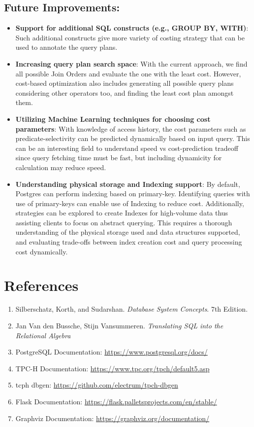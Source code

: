 \documentclass[12pt]{article}
\begin{document}
\subsection*{Future Improvements:}
\begin{itemize}
  \item \textbf{Support for additional SQL constructs (e.g., GROUP BY, WITH)}: Such additional constructs give more variety of costing strategy that can be used to annotate the query plans.
  \item \textbf{Increasing query plan search space}: With the current approach, we find all possible Join Orders and evaluate the one with the least cost. However, cost-based optimization also includes generating all possible query plans considering other operators too, and finding the least cost plan amongst them.
  \item \textbf{Utilizing Machine Learning techniques for choosing cost parameters}: With knowledge of access history, the cost parameters such as predicate-selectivity can be predicted dynamically based on input query. This can be an interesting field to understand speed vs cost-prediction tradeoff since query fetching time must be fast, but including dynamicity for calculation may reduce speed. 
  \item \textbf{Understanding physical storage and Indexing support}: By default, Postgres can perform indexing based on primary-key. Identifying queries with use of primary-keys can enable use of Indexing to reduce cost. Additionally, strategies can be explored to create Indexes for high-volume data thus assisting clients to focus on abstract querying. This requires a thorough understanding of the physical storage used and data structures supported, and evaluating trade-offs between index creation cost and query processing cost dynamically.
\end{itemize}

\section*{References}

\begin{enumerate}
  \item Silberschatz, Korth, and Sudarshan. \textit{Database System Concepts}. 7th Edition.
  \item Jan Van den Bussche, Stijn Vansummeren. \textit{Translating SQL into the Relational Algebra}
  \item PostgreSQL Documentation: \url{https://www.postgresql.org/docs/}
  \item TPC-H Documentation: \url{https://www.tpc.org/tpch/default5.asp}
  \item tcph dbgen: \url{https://github.com/electrum/tpch-dbgen}
  \item Flask Documentation: \url{https://flask.palletsprojects.com/en/stable/}
  \item Graphviz Documentation: \url{https://graphviz.org/documentation/}
\end{enumerate}
\end{document}
